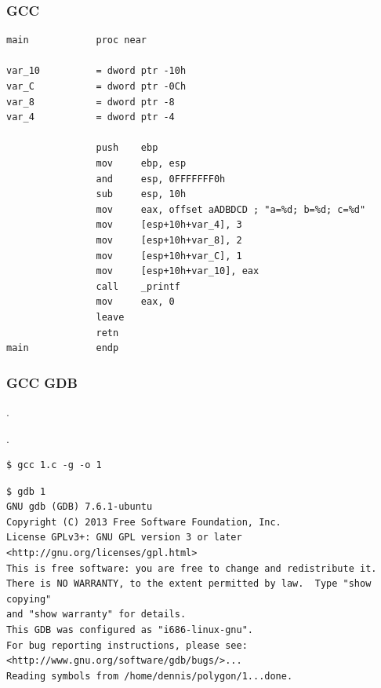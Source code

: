 \fi

\subsubsection{GCC}


\begin{lstlisting}
main            proc near

var_10          = dword ptr -10h
var_C           = dword ptr -0Ch
var_8           = dword ptr -8
var_4           = dword ptr -4

                push    ebp
                mov     ebp, esp
                and     esp, 0FFFFFFF0h
                sub     esp, 10h
                mov     eax, offset aADBDCD ; "a=%d; b=%d; c=%d"
                mov     [esp+10h+var_4], 3
                mov     [esp+10h+var_8], 2
                mov     [esp+10h+var_C], 1
                mov     [esp+10h+var_10], eax
                call    _printf
                mov     eax, 0
                leave
                retn
main            endp
\end{lstlisting}


\ifdefined\IncludeGDB
\subsubsection{GCC \AndENRU GDB}

.

 .

\begin{lstlisting}
$ gcc 1.c -g -o 1
\end{lstlisting}

\begin{lstlisting}
$ gdb 1
GNU gdb (GDB) 7.6.1-ubuntu
Copyright (C) 2013 Free Software Foundation, Inc.
License GPLv3+: GNU GPL version 3 or later <http://gnu.org/licenses/gpl.html>
This is free software: you are free to change and redistribute it.
There is NO WARRANTY, to the extent permitted by law.  Type "show copying"
and "show warranty" for details.
This GDB was configured as "i686-linux-gnu".
For bug reporting instructions, please see:
<http://www.gnu.org/software/gdb/bugs/>...
Reading symbols from /home/dennis/polygon/1...done.
\end{lstlisting}

